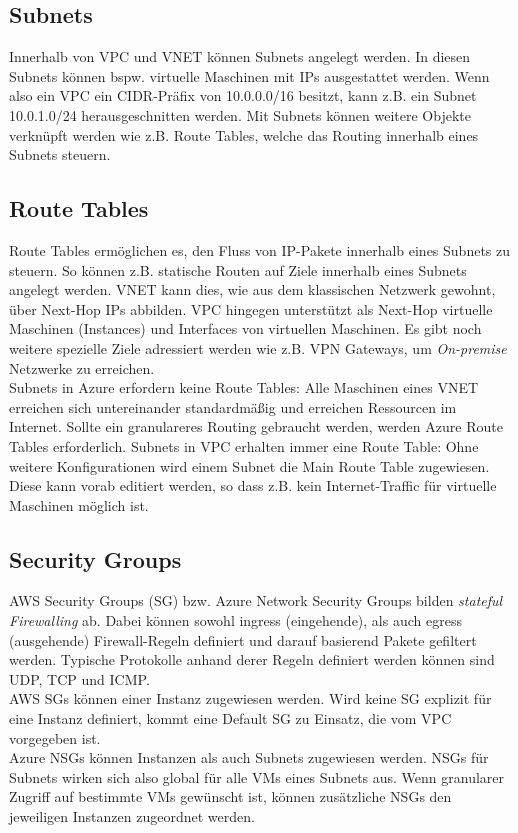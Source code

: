 \subsection{Subnets}
Innerhalb von VPC und VNET können Subnets angelegt werden. In diesen Subnets können bspw. virtuelle Maschinen mit IPs ausgestattet werden. Wenn also ein VPC ein CIDR-Präfix von 10.0.0.0/16 besitzt, kann z.B. ein Subnet 10.0.1.0/24 \glqq herausgeschnitten\grqq{} werden. Mit Subnets können weitere Objekte verknüpft werden wie z.B. Route Tables, welche das Routing innerhalb eines Subnets steuern.

\subsection{Route Tables}
Route Tables ermöglichen es, den Fluss von IP-Pakete innerhalb eines Subnets zu steuern. So können z.B. statische Routen auf Ziele innerhalb eines Subnets angelegt werden. VNET kann dies, wie aus dem klassischen Netzwerk gewohnt, über Next-Hop IPs abbilden. VPC hingegen unterstützt als Next-Hop virtuelle Maschinen (Instances) und Interfaces von virtuellen Maschinen. Es gibt noch weitere spezielle Ziele adressiert werden wie z.B. VPN Gateways, um \textit{On-premise} Netzwerke zu erreichen.\\
Subnets in Azure erfordern keine Route Tables: Alle Maschinen eines VNET erreichen sich untereinander standardmäßig und erreichen Ressourcen im Internet. Sollte ein granulareres Routing gebraucht werden, werden Azure Route Tables erforderlich. Subnets in VPC erhalten immer eine Route Table: Ohne weitere Konfigurationen wird einem Subnet die Main Route Table zugewiesen. Diese kann vorab editiert werden, so dass z.B. kein Internet-Traffic für virtuelle Maschinen möglich ist.

\subsection{Security Groups}
AWS Security Groups (SG) bzw. Azure Network Security Groups bilden \textit{stateful Firewalling} ab. Dabei können sowohl ingress (eingehende), als auch egress (ausgehende) Firewall-Regeln definiert und darauf basierend Pakete gefiltert werden. Typische Protokolle anhand derer Regeln definiert werden können sind UDP, TCP und ICMP.\\
AWS SGs können einer Instanz zugewiesen werden. Wird keine SG explizit für eine Instanz definiert, kommt eine Default SG zu Einsatz, die vom VPC vorgegeben ist.\\
Azure NSGs können Instanzen als auch Subnets zugewiesen werden. NSGs für Subnets wirken sich also global für alle VMs eines Subnets aus. Wenn granularer Zugriff auf bestimmte VMs gewünscht ist, können zusätzliche NSGs den jeweiligen Instanzen zugeordnet werden. 

